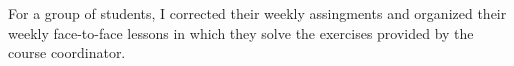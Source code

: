 
For a group of students, I corrected their weekly assingments and organized their weekly
face-to-face lessons in which they solve the exercises provided by the course coordinator.

\medskip
{}
